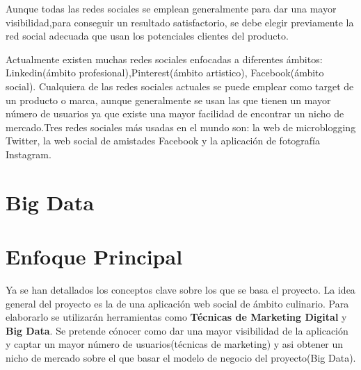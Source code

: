 Aunque todas las redes sociales se emplean generalmente para dar una mayor visibilidad,para conseguir un resultado satisfactorio, se debe elegir previamente la red social adecuada que usan los potenciales clientes del producto. 

\vspace{5 mm}

Actualmente existen muchas redes sociales enfocadas a diferentes ámbitos: Linkedin(ámbito profesional),Pinterest(ámbito artistico), Facebook(ámbito social). Cualquiera de las redes sociales actuales se puede emplear como target de un producto o marca, aunque generalmente se usan las que tienen un mayor número de usuarios ya que existe una mayor facilidad de encontrar un nicho de mercado.Tres redes sociales más usadas en el mundo son: la web de microblogging Twitter, la web social de amistades Facebook y la aplicación de fotografía Instagram.

\vspace{5 mm}

\section{Big Data}


\section{Enfoque Principal}

Ya se han detallados los conceptos clave sobre los que se basa el proyecto. La idea general del proyecto es la de una aplicación web social de ámbito culinario. Para elaborarlo se utilizarán herramientas como \textbf{Técnicas de Marketing Digital} y \textbf{Big Data}. Se pretende cónocer como dar una mayor visibilidad de la aplicación y captar un mayor número de usuarios(técnicas de marketing) y asi obtener un nicho de mercado sobre el que basar el modelo de negocio del proyecto(Big Data).

